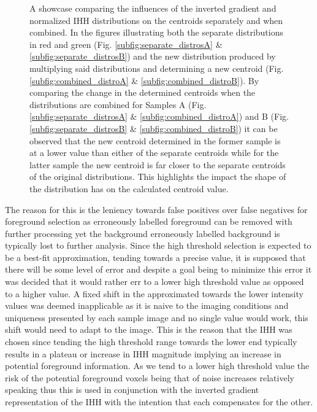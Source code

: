 \begin{figure}
    \caption[A showcase comparing the influences of the inverted gradient and normalized IHH distributions on the centroids separately and when combined]{A showcase comparing the influences of the inverted gradient and normalized IHH distributions on the centroids separately and when combined. In the figures illustrating both the separate distributions in red and green (Fig. \ref{subfig:separate_distrosA} \& \ref{subfig:separate_distrosB}) and the new distribution produced by multiplying said distributions and determining a new centroid (Fig. \ref{subfig:combined_distroA} \& \ref{subfig:combined_distroB}). By comparing the change in the determined centroids when the distributions are combined for Samples A (Fig. \ref{subfig:separate_distrosA} \& \ref{subfig:combined_distroA}) and B (Fig. \ref{subfig:separate_distrosB} \& \ref{subfig:combined_distroB}) it can be observed that the new centroid determined in the former sample is at a lower value than either of the separate centroids while for the latter sample the new centroid is far closer to the separate centroids of the original distributions. This highlights the impact the shape of the distribution has on the calculated centroid value.}
    \label{fig:distro_centroid_compare}
\end{figure}
The reason for this is the leniency towards false positives over false negatives for foreground selection as erroneously labelled foreground can be removed with further processing yet the background erroneously labelled background is typically lost to further analysis. Since the high threshold selection is expected to be a best-fit approximation, tending towards a precise value, it is supposed that there will be some level of error and despite a goal being to minimize this error it was decided that it would rather err to a lower high threshold value as opposed to a higher value. A fixed shift in the approximated towards the lower intensity values was deemed inapplicable as it is naive to the imaging conditions and uniqueness presented by each sample image and no single value would work, this shift would need to adapt to the image. This is the reason that the IHH was chosen since tending the high threshold range towards the lower end typically results in a plateau or increase in IHH magnitude implying an increase in potential foreground information. As we tend to a lower high threshold value the risk of the potential foreground voxels being that of noise increases relatively speaking thus this is used in conjunction with the inverted gradient representation of the IHH with the intention that each compensates for the other.
